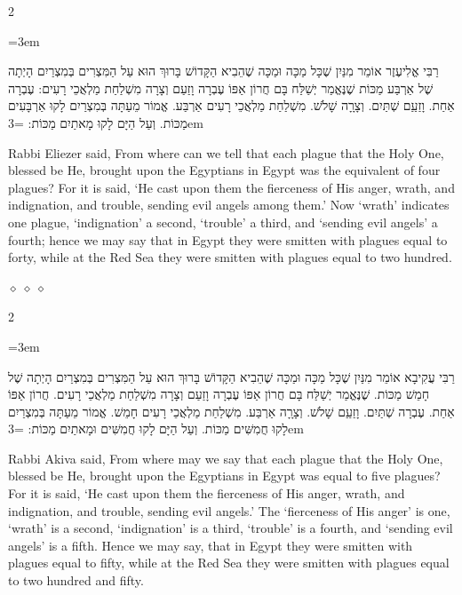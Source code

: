\documentclass[11pt, openany]{book}
\newcommand{\sederdivider}{%
  \par\vspace{6pt}
  \begin{center}
    \textcolor{sedergold}{\pgfornament[width=1.5cm]{11}}
  \end{center}
  \par\vspace{6pt}
}
\newenvironment{bilingual}{%
  \par\vspace{4pt}%
  \begin{paracol}{2}%
}{%
  \end{paracol}%
  \par\vspace{2pt}%
}
\newenvironment{hebrewcol}{%
  \switchcolumn[1]%
  \begingroup
  \RTL
  \hebrewfont\large
  \setstretch{1.4}%
  \emergencystretch=3em
  \tolerance=9999
  \parindent=0pt\relax
}{%
  \endRTL
  \endgroup
}
\newenvironment{englishcol}{%
  \switchcolumn[0]%
  \begingroup
  \setstretch{1.4}%
  \emergencystretch=3em
  \tolerance=9999
  \normalsize
  \rightskip=0.12in\relax
}{%
  \endgroup
}
\newcommand{\parasep}{%
  \par\vspace{3pt}
  \begin{center}
    \textcolor{sedergold!50}{\tiny$\diamond\;\diamond\;\diamond$}
  \end{center}
  \par\vspace{3pt}
}
\begin{document}
\begin{bilingual}
\begin{hebrewcol}
רַבִּי אֱלִיעֶזֶר אוֹמֵר מִנַּיִן שֶׁכָּל מַכָּה וּמַכָּה שֶׁהֵבִיא הַקָּדוֹשׁ בָּרוּךְ הוּא עַל הַמִּצְרִים בְּמִצְרַיִם הָיְתָה שֶׁל אַרְבַּע מַכּוֹת שֶׁנֶּאֱמַר יְשַׁלַּח בָּם חֲרוֹן אַפּוֹ עֶבְרָה וָזַעַם וְצָרָה מִשְׁלַחַת מַלְאֲכֵי רָעִים: עֶבְרָה אַחַת. וָזַעַַם שְׁתַּיִם. וְצָרָָה שָׁלֹשׁ. מִשְׁלַחַת מַלְאֲכֵי רָעִים אַרְבַּע. אֱמוֹר מֵעַתָּה בְּמִצְרַיִם לָקוּ אַרְבָּעִים מַכּוֹת. וְעַל הַיָּם לָקוּ מָאתַיִם מַכּוֹת:
\end{hebrewcol}
\begin{englishcol}
Rabbi Eliezer said, From where can we tell  that each plague that the Holy One, blessed be He, brought upon the Egyptians in Egypt was the equivalent of four plagues? For it is said, ‘He cast upon them the fierceness of His anger, wrath, and indignation, and trouble, sending evil angels among them.’ Now ‘wrath’ indicates one plague, ‘indignation’ a second, ‘trouble’ a third, and ‘sending evil angels’ a fourth; hence we may say that in Egypt they were smitten with plagues equal to forty, while at the Red Sea they were smitten with plagues equal to two hundred.
\end{englishcol}
\end{bilingual}
\parasep

\begin{bilingual}
\begin{hebrewcol}
רַבִּי עֲקִיבָא אוֹמֵר מִנַּיִן שֶׁכָּל מַכָּה וּמַכָּה שֶׁהֵבִיא הַקָּדוֹשׁ בָּרוּךְ הוּא עַל הַמִּצְרִים בְּמִצְרַיִם הָיְתָה שֶׁל חָמֵשׁ מַכּוֹת. שֶׁנֶּאֱמַר יְשַׁלַּח בָּם חֲרוֹן אַפּוֹ עֶבְרָה וָזַעַם וְצָרָה מִשְׁלַחַת מַלְאֲכֵי רָעִים. חֲרוֹן אַפּוֹ אַחַת. עֶבְרָה שְׁתַּיִם. וָזַעַַם שָׁלֹשׁ. וְצָרָָה אַרְבַּע. מִשְׁלַחַת מַלְאֲכֵי רָעִים חָמֵשׁ. אֱמוֹר מֵעַתָּה בְּמִצְרַיִם לָקוּ חֲמִשִּׁים מַכּוֹת. וְעַל הַיָּם לָקוּ חֲמִשִּׁים וּמָאתַיִם מַכּוֹת:
\end{hebrewcol}
\begin{englishcol}
Rabbi Akiva said, From where may we say  that each plague that the Holy One, blessed be He, brought upon the Egyptians in Egypt was equal to five plagues? For it is said, ‘He cast upon them the fierceness of His anger, wrath, and indignation, and trouble, sending evil angels.’ The ‘fierceness of His anger’ is one, ‘wrath’ is a second, ‘indignation’ is a third, ‘trouble’ is a fourth, and ‘sending evil angels’ is a fifth. Hence we may say, that in Egypt they were smitten with plagues equal to fifty, while at the Red Sea they were smitten with plagues equal to two hundred and fifty.
\end{englishcol}
\end{bilingual}
\sederdivider
\end{document}
